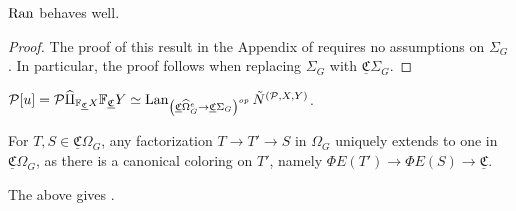 \documentclass[a4paper,10pt
]{article}%
\newcommand{\UC}{\underline{\mathfrak C}}
\renewcommand{\1}{\ensuremath{\mathbb{id}}}
\renewcommand{\hat}{\widehat}
\begin{document}
\begin{proposition}
      [{cf. \cite[Prop 5.37]{BP17}}]
      $\operatorname{Ran}$ behaves well.
\end{proposition}
\begin{proof}
      The proof of this result in the Appendix of \cite{BP17} requires no assumptions on $\Sigma_G$.
      In particular, the proof follows when replacing $\Sigma_G$ with $\UC\Sigma_G$.
\end{proof}

\begin{corollary}
      $\mathcal P[u] = \mathcal P \hat\amalg_{\mathbb F_{\UC}X}\mathbb F_{\UC}Y
      \simeq
      \Lan_{\left(\UC\hat\Omega_G^e \to \UC\Sigma_G\right)^{op}}\tilde N^{(\mathcal P, X, Y)}$.
\end{corollary}


\begin{remark}
      For $T,S \in \UC\Omega_G$, any factorization $T \to T' \to S$ in $\Omega_G$ uniquely extends to one in $\UC\Omega_G$,
      as there is a canonical coloring on $T'$, namely $\Phi E(T') \to \Phi E(S) \to \UC$. 
\end{remark}

The above gives \cite[Lem 5.57]{BP17}.
\end{document}
